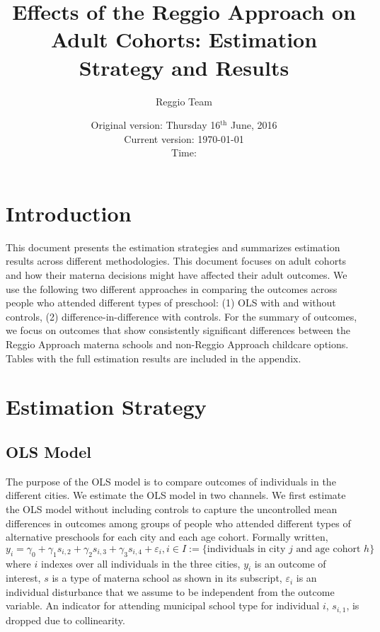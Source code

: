 \documentclass[11pt]{article}
\begin{document}
\title{Effects of the Reggio Approach on Adult Cohorts: Estimation Strategy and Results}
\author{Reggio Team}
\date{Original version: Thursday  16$^{\text{th}}$ June, 2016 \\ Current version: \today \\ \vspace{1em} Time: \currenttime}
\maketitle

\doublespacing

\section{Introduction}

This document presents the estimation strategies and summarizes estimation results across different methodologies. This document focuses on adult cohorts and how their materna decisions might have affected their adult outcomes. We use the following two different approaches in comparing the outcomes across people who attended different types of preschool: (1) OLS with and without controls, (2) difference-in-difference with controls. For the summary of outcomes, we focus on outcomes that show consistently significant differences between the Reggio Approach materna schools and non-Reggio Approach childcare options. Tables with the full estimation results are included in the appendix. 

\section{Estimation Strategy}
\subsection{OLS Model}
The purpose of the OLS model is to compare outcomes of individuals in the different cities. We estimate the OLS model in two channels. We first estimate the OLS model without including controls to capture the uncontrolled mean differences in outcomes among groups of people who attended different types of alternative preschools for each city and each age cohort. Formally written,
\begin{equation} \label{OLS-nocontrol}
	y_{i} = \gamma_0 + \gamma_1 s_{i,2} + \gamma_2 s_{i,3} + \gamma_3 s_{i,4} +\varepsilon_{i}, i \in I := \{ \text{individuals in city $j$ and age cohort $h$}\}
\end{equation}
\noindent where $i$ indexes over all individuals in the three cities, $y_{i}$ is an outcome of interest, $s$ is a type of materna school as shown in its subscript, $\varepsilon_{i}$ is an individual disturbance that we assume to be independent from the outcome variable. An indicator for attending municipal school type for individual $i$, $s_{i,1}$, is dropped due to collinearity. 
\end{document}
